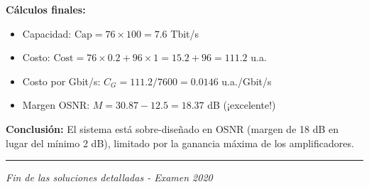 \documentclass[a4paper,10pt]{article}
\begin{document}
\textbf{Cálculos finales:}
\begin{itemize}
    \item Capacidad: $\text{Cap} = 76 \times 100 = 7.6$ Tbit/s
    \item Costo: $\text{Cost} = 76 \times 0.2 + 96 \times 1 = 15.2 + 96 = 111.2$ u.a.
    \item Costo por Gbit/s: $C_G = 111.2 / 7600 = 0.0146$ u.a./Gbit/s
    \item Margen OSNR: $M = 30.87 - 12.5 = 18.37$ dB (¡excelente!)
\end{itemize}

\textbf{Conclusión:} El sistema está sobre-diseñado en OSNR (margen de 18 dB en lugar del mínimo 2 dB), limitado por la ganancia máxima de los amplificadores.

\vspace{1cm}
\hrule
\begin{center}
\textit{Fin de las soluciones detalladas - Examen 2020}
\end{center}
\end{document}

